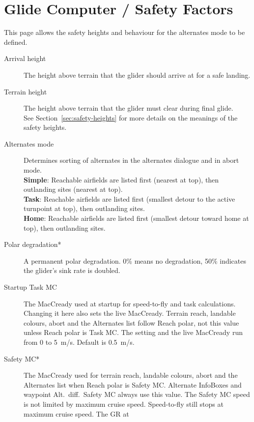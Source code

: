 \section{Glide Computer / Safety Factors}\label{sec:safety-factors}

This page allows the safety heights and behaviour for the alternates mode to be defined.

\begin{description}
\item[Arrival height]  \label{conf:safetyarrival} The height above terrain that the glider
  should arrive at for a safe landing.
\item[Terrain height]  \label{conf:safetyterrain} The height above terrain that 
  the glider must clear during final glide. \\
See Section~\ref{sec:safety-heights} for more details on the meanings
of the safety heights. \\
\item[Alternates mode]  \label{conf:alternatesmode} Determines sorting of
  alternates in the alternates dialogue and in abort mode. \\
  {\bf Simple}: Reachable airfields are listed first (nearest at top), then
    outlanding sites (nearest at top). \\
  {\bf Task}: Reachable airfields are listed first (smallest detour to the
    active turnpoint at top), then outlanding sites. \\
  {\bf Home}: Reachable airfields are listed first (smallest detour toward
    home at top), then outlanding sites.
\item[Polar degradation*]  A permanent polar degradation. 0\% means no degradation, 
  50\% indicates the glider's sink rate is doubled.
\item[Startup Task MC]  \label{conf:taskMC} The MacCready used at startup for
  speed-to-fly and task calculations.  Changing it here also sets the live
  MacCready.  Terrain reach, landable colours, abort and the Alternates list
  follow Reach polar, not this value unless Reach polar is Task MC.
  The setting and the live MacCready run from 0 to 5~m/s.
  Default is 0.5~m/s.
\item[Safety MC*]  The MacCready used for terrain reach, landable colours,
  abort and the Alternates list when Reach polar is Safety MC.  Alternate
  InfoBoxes and waypoint Alt.\ diff.\ Safety MC always use this value.
  The Safety MC speed is not limited by maximum cruise speed.
  Speed-to-fly still stops at maximum cruise speed.  The GR at

\end{description}
